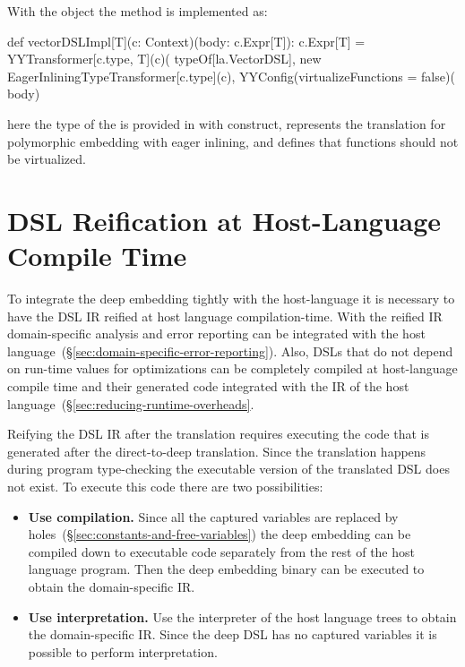 With the  object the method  is implemented as:\begin{lstparagraph}
  def vectorDSLImpl[T](c: Context)(body: c.Expr[T]): c.Expr[T] =
    YYTransformer[c.type, T](c)(
      typeOf[la.VectorDSL],
      new EagerInliningTypeTransformer[c.type](c),
      YYConfig(virtualizeFunctions = false)(
      body)
\end{lstparagraph}

here the type of the  is provided in with  construct,
 represents the translation for polymorphic embedding with eager inlining,
 and  defines that functions should not be virtualized.


\chapter{DSL Reification at Host-Language Compile Time}
\label{sec:compile-time-reification}

To integrate the deep embedding tightly with the host-language it is necessary to
 have the DSL IR reified at host language compilation-time. With the reified IR
 domain-specific analysis and error reporting can be integrated with the host language~(\S \ref{sec:domain-specific-error-reporting}).
 Also, DSLs that do not depend on run-time values for optimizations can be completely compiled
 at host-language compile time and their generated code integrated with the IR of the host language~(\S \ref{sec:reducing-runtime-overheads}.

Reifying the DSL IR after the translation requires executing the code that is generated
 after the direct-to-deep translation. Since the translation happens during program type-checking
 the executable version of the translated DSL does not exist. To execute this code there
 are two possibilities:\begin{itemize}
 \item {\bf Use compilation.} Since all the captured variables are replaced by holes~(\S \ref{sec:constants-and-free-variables}) the
  deep embedding can be compiled down to executable code separately from the rest of the host language program.
  Then the deep embedding binary can be executed to obtain the domain-specific IR.

 \item {\bf Use interpretation.} Use the interpreter of the host language trees to obtain the
  domain-specific IR. Since the deep DSL has no captured variables it is possible to
  perform interpretation.
 \end{itemize}

